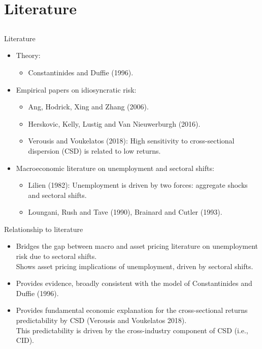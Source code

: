 \documentclass{beamer}
\begin{document}
\section{Literature}
\subsection{}

\begin{frame}{Literature}
\begin{itemize}
    \item {Theory:}
    \begin{itemize}
        \item {Constantinides and Duffie (1996).}
    \end{itemize}
    \item {Empirical papers on idiosyncratic risk:}
    \begin{itemize}
        \item {Ang, Hodrick, Xing and Zhang (2006).}
        \item {Herskovic, Kelly, Lustig and Van Nieuwerburgh (2016).}
        \item {Verousis and Voukelatos (2018): High sensitivity to cross-sectional dispersion (CSD) is related to low returns.}
    \end{itemize}
    \item {Macroeconomic literature on unemployment and sectoral shifts:}
    \begin{itemize}
        \item {Lilien (1982): Unemployment is driven by two forces: aggregate shocks and sectoral shifts.}
        \item {Loungani, Rush and Tave (1990), Brainard and Cutler (1993).}
    \end{itemize}
\end{itemize}
\end{frame}



\begin{frame}{Relationship to literature}
\begin{itemize}
    \item {Bridges the gap between macro and asset pricing literature on unemployment risk due to sectoral shifts. \\ Shows asset pricing implications of unemployment, driven by sectoral shifts.}
    \item {Provides evidence, broadly consistent with the model of Constantinides and Duffie (1996).}
    \item {Provides fundamental economic explanation for the cross-sectional returns predictability by CSD (Verousis and Voukelatos 2018).\\
    This predictability is driven by the cross-industry component of CSD (i.e., CID).}
\end{itemize}
\end{frame}
\end{document}
